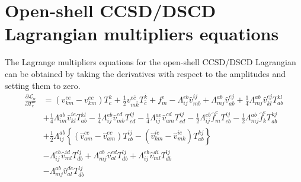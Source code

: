 \documentclass[a4paper,12pt,oneside]{book}
\newcommand{\half}{\frac{1}{2}}
\newcommand{\quart}{\frac{1}{4}}
\newcommand{\spa}[1]{{#1}}
\newcommand{\spb}[1]{\bar{#1}}
\begin{document}
\section{Open-shell CCSD/DSCD Lagrangian multipliers equations}
The Lagrange multipliers equations for the open-shell CCSD/DSCD Lagrangian can be obtained by
taking the derivatives with respect to the amplitudes and setting them to zero.
\begin{equation}
\begin{aligned}
\frac{\partial\mathcal{L}_{\alpha}}{\partial T^{\spa{m}}_{\spa{e}}}&=
\left(v_{\spa{k}\spa{m}}^{\spa{c}\spa{e}} - v_{\spa{k}\spa{m}}^{\spa{e}\spa{c}}\right) T^{\spa{k}}_{\spa{c}} 
+ \half v_{\spa{m}\spb{k}}^{\spa{e}\spb{c}}T^{\spb{k}}_{\spb{c}} +  f_{\spa{m}}^{\spa{e}}
- Λ_{\spa{i}\spa{j}}^{\spa{e}\spa{b}} \hat v_{\spa{m}\spa{b}}^{\spa{i}\spa{j}}
+ Λ_{\spa{m}\spa{j}}^{\spa{a}\spa{b}} \hat v_{\spa{a}\spa{b}}^{\spa{e}\spa{j}}
+ \quart Λ_{\spa{m}\spa{j}}^{\spa{a}\spa{b}} \hat v_{\spa{k}\spa{l}}^{\spa{e}\spa{j}} T^{\spa{k}\spa{l}}_{\spa{a}\spa{b}}\\
&+ \quart Λ_{\spa{i}\spa{m}}^{\spa{a}\spa{b}} \hat v_{\spa{k}\spa{l}}^{\spa{i}\spa{e}} T^{\spa{k}\spa{l}}_{\spa{a}\spa{b}}
- \quart Λ_{\spa{i}\spa{j}}^{\spa{e}\spa{b}} \hat v_{\spa{m}\spa{b}}^{\spa{c}\spa{d}} T^{\spa{i}\spa{j}}_{\spa{c}\spa{d}}
- \quart Λ_{\spa{i}\spa{j}}^{\spa{a}\spa{e}} \hat v_{\spa{a}\spa{m}}^{\spa{c}\spa{d}} T^{\spa{i}\spa{j}}_{\spa{c}\spa{d}}
- \half Λ_{\spa{i}\spa{j}}^{\spa{e}\spa{b}} \hat f_{\spa{m}}^{\spa{c}} T^{\spa{i}\spa{j}}_{\spa{c}\spa{b}}
- \half Λ_{\spa{m}\spa{j}}^{\spa{a}\spa{b}} \hat f_{\spa{k}}^{\spa{e}} T^{\spa{k}\spa{j}}_{\spa{a}\spa{b}} \\
&+ \half Λ_{\spa{i}\spa{j}}^{\spa{a}\spa{b}} \left\{
  \left(\hat v_{\spa{a}\spa{m}}^{\spa{c}\spa{e}}-\hat v_{\spa{a}\spa{m}}^{\spa{e}\spa{c}}\right) T^{\spa{i}\spa{j}}_{\spa{c}\spa{b}}
-  \left(\hat v_{\spa{k}\spa{m}}^{\spa{i}\spa{e}}-\hat v_{\spa{m}\spa{k}}^{\spa{i}\spa{e}}\right) T^{\spa{k}\spa{j}}_{\spa{a}\spa{b}}\right\}\\
&- Λ_{\spa{i}\spa{j}}^{\spa{e}\spa{b}} 
 \hat v_{\spa{m}\spa{l}}^{\spa{i}\spa{d}} T^{\spa{l}\spa{j}}_{\spa{d}\spa{b}}
+ Λ_{\spa{m}\spa{j}}^{\spa{a}\spa{b}} 
 \hat v_{\spa{a}\spa{l}}^{\spa{e}\spa{d}} T^{\spa{l}\spa{j}}_{\spa{d}\spa{b}}
+ Λ_{\spa{i}\spa{j}}^{\spa{e}\spa{b}} 
 \hat v_{\spa{m}\spa{l}}^{\spa{d}\spa{i}}T^{\spa{l}\spa{j}}_{\spa{d}\spa{b}}\\
&- Λ_{\spa{m}\spa{j}}^{\spa{a}\spa{b}} 
 \hat v_{\spa{a}\spa{l}}^{\spa{d}\spa{e}}T^{\spa{l}\spa{j}}_{\spa{d}\spa{b}}

\end{aligned}
\end{equation}
\end{document}
